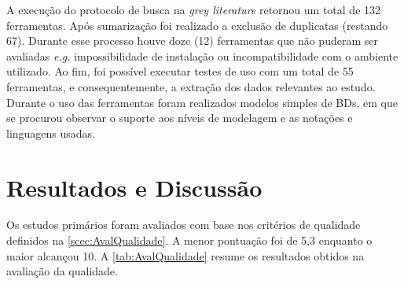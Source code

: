 A execução do protocolo de busca na \textit{grey literature} retornou um total de 132 ferramentas. 
Após sumarização foi realizado a exclusão de duplicatas (restando 67).
Durante esse processo houve doze (12) ferramentas que não puderam ser avaliadas 
\textit{e.g.} impossibilidade de instalação ou incompatibilidade com o ambiente utilizado. 
Ao fim, foi possível executar testes de uso com um total de 55 ferramentas, e consequentemente, a extração dos dados relevantes ao estudo. 
Durante o uso das ferramentas foram realizados modelos simples de \acp{BD}, em que se procurou observar o suporte aos níveis de modelagem e as notações e linguagens usadas.

\section{Resultados e Discussão} \label{sec:ResultDis}

Os estudos primários foram avaliados com base nos critérios de qualidade definidos na \autoref{scec:AvalQualidade}.
A menor pontuação foi de 5,3 enquanto o maior alcançou 10. 
A \autoref{tab:AvalQualidade} resume os resultados obtidos na avaliação da qualidade.


